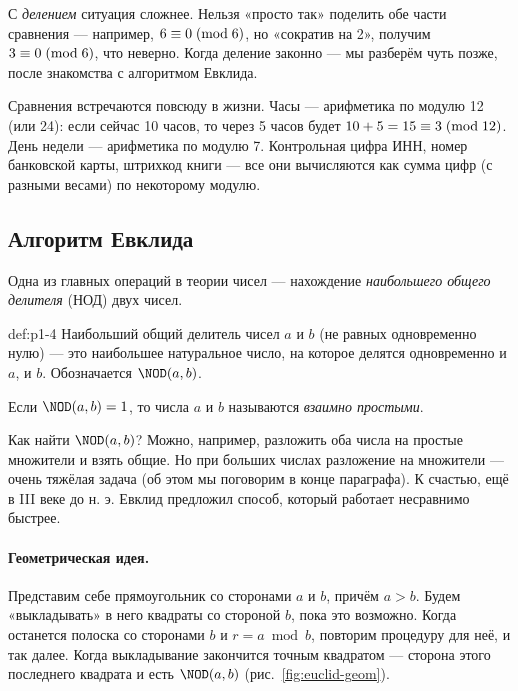 С \emph{делением} ситуация сложнее. Нельзя «просто так» поделить обе части сравнения --- например, $6 \equiv 0 \;(\mathrm{mod}\;6)$, но «сократив на 2», получим $3 \equiv 0 \;(\mathrm{mod}\;6)$, что неверно. Когда деление законно --- мы разберём чуть позже, после знакомства с алгоритмом Евклида.

\begin{interestbox}
Сравнения встречаются повсюду в жизни. Часы --- арифметика по модулю 12 (или 24): если сейчас 10 часов, то через 5 часов будет $10 + 5 = 15 \equiv 3 \;(\mathrm{mod}\;12)$. День недели --- арифметика по модулю 7. Контрольная цифра ИНН, номер банковской карты, штрихкод книги --- все они вычисляются как сумма цифр (с разными весами) по некоторому модулю.
\end{interestbox}

\subsection{Алгоритм Евклида}
\label{subsec:euclid}

Одна из главных операций в теории чисел --- нахождение \emph{наибольшего общего делителя} (НОД) двух чисел.

\begin{definition}{}{def:p1-4}
Наибольший общий делитель чисел $a$ и $b$ (не равных одновременно нулю) --- это наибольшее натуральное число, на которое делятся одновременно и $a$, и $b$. Обозначается $\NOD(a,b)$.

Если $\NOD(a,b) = 1$, то числа $a$ и $b$ называются \emph{взаимно простыми}.
\end{definition}

Как найти $\NOD(a,b)$? Можно, например, разложить оба числа на простые множители и взять общие. Но при больших числах разложение на множители --- очень тяжёлая задача (об этом мы поговорим в конце параграфа). К счастью, ещё в III веке до н. э. Евклид предложил способ, который работает несравнимо быстрее.

\paragraph*{Геометрическая идея.} Представим себе прямоугольник со сторонами $a$ и $b$, причём $a > b$. Будем «выкладывать» в него квадраты со стороной $b$, пока это возможно. Когда останется полоска со сторонами $b$ и $r = a \bmod b$, повторим процедуру для неё, и так далее. Когда выкладывание закончится точным квадратом --- сторона этого последнего квадрата и есть $\NOD(a,b)$ (рис.~\ref{fig:euclid-geom}).

